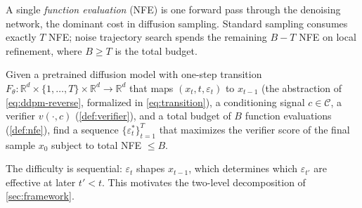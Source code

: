 \begin{definition}
\label{def:nfe}
A single \emph{function evaluation} (NFE) is one forward pass through the denoising network, the dominant cost in diffusion sampling. Standard sampling consumes exactly $T$ NFE; noise trajectory search spends the remaining $B - T$ NFE on local refinement, where $B \ge T$ is the total budget.
\end{definition}

\begin{definition}
\label{def:nts}
Given a pretrained diffusion model with one-step transition $F_\theta : \mathbb{R}^d \times \{1, \dots, T\} \times \mathbb{R}^d \to \mathbb{R}^d$ that maps $(x_t, t, \varepsilon_t)$ to $x_{t-1}$ (the abstraction of \cref{eq:ddpm-reverse}, formalized in \cref{eq:transition}), a conditioning signal $c \in \mathcal{C}$, a verifier $v(\cdot, c)$ (\cref{def:verifier}), and a total budget of $B$ function evaluations (\cref{def:nfe}), find a sequence $\{\varepsilon_t^*\}_{t=1}^T$ that maximizes the verifier score of the final sample $x_0$ subject to total NFE $\le B$.
\end{definition}

The difficulty is sequential: $\varepsilon_t$ shapes $x_{t-1}$, which determines which $\varepsilon_{t'}$ are effective at later $t' < t$. This motivates the two-level decomposition of \cref{sec:framework}.
